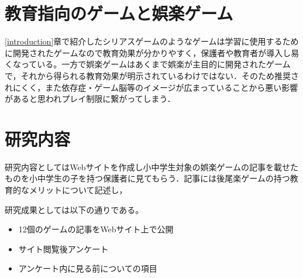 \documentclass[twocolumn,10pt,a4j]{ltjsarticle}
\begin{document}


\section{教育指向のゲームと娯楽ゲーム}
\ref{introduction}章で紹介したシリアスゲームのようなゲームは学習に使用するために開発されたゲームなので教育効果が分かりやすく，保護者や教育者が導入し易くなっている。一方で娯楽ゲームはあくまで娯楽が主目的に開発されたゲームで，それから得られる教育効果が明示されているわけではない．そのため推奨されにくく，また依存症・ゲーム脳等のイメージが広まっていることから悪い影響があると思われプレイ制限に繋がってしまう．






\section{研究内容}
研究内容としてはWebサイトを作成し小中学生対象の娯楽ゲームの記事を載せたものを小中学生の子を持つ保護者に見てもらう．記事には後尾楽ゲームの持つ教育的なメリットについて記述し，

研究成果としては以下の通りである。
\begin{itemize}
\item 12個のゲームの記事をWebサイト上で公開
\item サイト閲覧後アンケート
\item アンケート内に見る前についての項目
\end{itemize}
\end{document}
